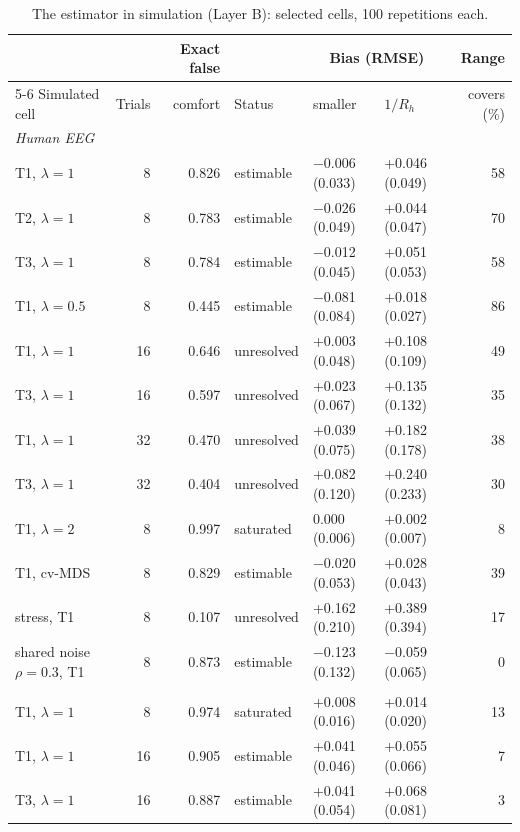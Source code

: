 \documentclass[11pt]{article}
\begin{document}
\begin{table}[!htb]
\centering\small
\caption{The estimator in simulation (Layer B): selected cells, 100 repetitions each.}
\label{tab:validation}
\setlength{\tabcolsep}{4pt}
\begin{tabular}{lrrlllr}
\toprule
 & & Exact false & & \multicolumn{2}{c}{Bias (RMSE)} & Range \\
\cmidrule(lr){5-6}
Simulated cell & Trials & comfort & Status & smaller & $1/R_h$ & covers (\%) \\
\midrule
\multicolumn{7}{l}{\textit{Human EEG}} \\
\quad T1, $\lambda=1$ & 8 & 0.826 & estimable & $-$0.006 (0.033) & +0.046 (0.049) & 58 \\
\quad T2, $\lambda=1$ & 8 & 0.783 & estimable & $-$0.026 (0.049) & +0.044 (0.047) & 70 \\
\quad T3, $\lambda=1$ & 8 & 0.784 & estimable & $-$0.012 (0.045) & +0.051 (0.053) & 58 \\
\quad T1, $\lambda=0.5$ & 8 & 0.445 & estimable & $-$0.081 (0.084) & +0.018 (0.027) & 86 \\
\quad T1, $\lambda=1$ & 16 & 0.646 & unresolved & +0.003 (0.048) & +0.108 (0.109) & 49 \\
\quad T3, $\lambda=1$ & 16 & 0.597 & unresolved & +0.023 (0.067) & +0.135 (0.132) & 35 \\
\quad T1, $\lambda=1$ & 32 & 0.470 & unresolved & +0.039 (0.075) & +0.182 (0.178) & 38 \\
\quad T3, $\lambda=1$ & 32 & 0.404 & unresolved & +0.082 (0.120) & +0.240 (0.233) & 30 \\
\quad T1, $\lambda=2$ & 8 & 0.997 & saturated & 0.000 (0.006) & +0.002 (0.007) & 8 \\
\quad T1, cv-MDS & 8 & 0.829 & estimable & $-$0.020 (0.053) & +0.028 (0.043) & 39 \\
\quad stress, T1 & 8 & 0.107 & unresolved & +0.162 (0.210) & +0.389 (0.394) & 17 \\
\quad shared noise $\rho=0.3$, T1 & 8 & 0.873 & estimable & $-$0.123 (0.132) & $-$0.059 (0.065) & 0 \\
\addlinespace
\multicolumn{7}{l}{\textit{Mouse V1}} \\
\quad T1, $\lambda=1$ & 8 & 0.974 & saturated & +0.008 (0.016) & +0.014 (0.020) & 13 \\
\quad T1, $\lambda=1$ & 16 & 0.905 & estimable & +0.041 (0.046) & +0.055 (0.066) & 7 \\
\quad T3, $\lambda=1$ & 16 & 0.887 & estimable & +0.041 (0.054) & +0.068 (0.081) & 3 \\

\end{tabular}
\end{table}
\end{document}
